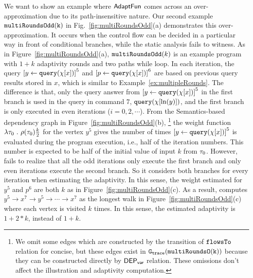 We want to show an example where $\textsf{AdaptFun}$ comes across an over-approximation due to its path-insensitive nature. 
    Our second example $\mathtt{multiRoundsOdd(k)}$ in Fig.~\ref{fig:multiRoundsOdd}(a) demonstrates this over-approximation.
It occurs when the control flow can be decided in a particular way in front of conditional branches,
while the static analysis fails to witness. 
As in Figure~\ref{fig:multiRoundsOdd}(a), $\mathtt{multiRoundsOdd}(k)$
is an example program with $1 + k$ adaptivity rounds and two paths while loop.
In each iteration, the query $\clabel{\assign{y}{\query(\chi[x])}}^{5}$
and $\clabel{\assign{p}{\query(\chi[x])}}^{6}$ are based on previous query results stored in $x$,
which is similar to Example~\ref{ex:multipleRounds}.
The difference is that, only the query answer from $\clabel{\assign{y}{\query(\chi[x])}}^{5}$ in the first branch
is used in the query in command $7$, ${\tt query}(\chi[\ln(y)])$,
and the first branch is only executed in even iterations ($i = 0, 2, \cdots $).
From the Semantics-based dependency graph in Figure~\ref{fig:multiRoundsOdd}(b),
\footnote{We omit some edges which are constructed by the transition of $\mathtt{flowsTo}$ relation
for concise, but these edges exist
in $\mathtt{{G_{trace}}}(\mathtt{multiRoundsO(k)})$ because they can be constructed directly by $\mathsf{DEP_{var}}$ relation.
These omissions don't affect the illustration and adaptivity computation.} 
the weight function $\lambda \mathtt{\tau}_0 ~.~ \rho(\mathtt{\tau}_0) \frac{k}{2}$ for the vertex $y^5$ gives the
number of times $\clabel{\assign{y}{\query(\chi[x])}}^{5}$ is evaluated during the program execution, i.e., half of the iteration numbers.
This number is expected to be half of the initial value of input $k$ from $\mathtt{\tau}_0$.
However, {\THESYSTEM} fails to realize that all the odd iterations only execute the first branch
and only even iterations execute the second branch. 
So it considers both branches for every iteration when estimating the adaptivity. 
In this sense, the weight estimated for $y^5$ and $p^6$ are both 
$k$ as in Figure~\ref{fig:multiRoundsOdd}(c).
As a result, {\THESYSTEM} computes $y^5  \to x^7  \to y^5  \to \cdots \to x^7 $
as the longest walk in Figure~\ref{fig:multiRoundsOdd}(c)
where each vertex is visited $k$ times.
In this sense, the estimated adaptivity is $1 + 2 * k$, instead of $1 + k$. 
%
